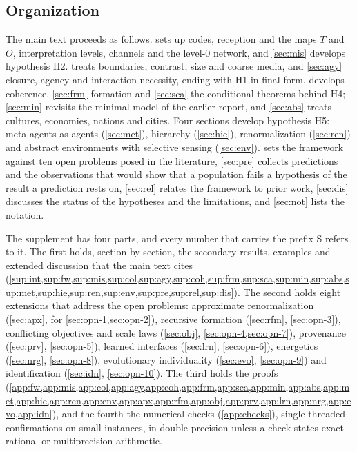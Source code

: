 \subsection{Organization}\label{sec:int-organization}

The main text proceeds as follows.  sets up codes, reception and the maps $T$ and $O$, interpretation levels, channels and the level-0 network, and \cref{sec:mis} develops hypothesis H2.  treats boundaries, contrast, size and coarse media, and \cref{sec:agy} closure, agency and interaction necessity, ending with H1 in final form.  develops coherence, \cref{sec:frm} formation and \cref{sec:sca} the conditional theorems behind H4; \cref{sec:min} revisits the minimal model of the earlier report, and \cref{sec:abs} treats cultures, economies, nations and cities. Four sections develop hypothesis H5: meta-agents as agents (\cref{sec:met}), hierarchy (\cref{sec:hie}), renormalization (\cref{sec:ren}) and abstract environments with selective sensing (\cref{sec:env}).  sets the framework against ten open problems posed in the literature, \cref{sec:pre} collects predictions and the observations that would show that a population fails a hypothesis of the result a prediction rests on, \cref{sec:rel} relates the framework to prior work, \cref{sec:dis} discusses the status of the hypotheses and the limitations, and \cref{sec:not} lists the notation.

The supplement has four parts, and every number that carries the prefix S refers to it. The first holds, section by section, the secondary results, examples and extended discussion that the main text cites (\cref{sup:int,sup:fw,sup:mis,sup:col,sup:agy,sup:coh,sup:frm,sup:sca,sup:min,sup:abs,sup:met,sup:hie,sup:ren,sup:env,sup:pre,sup:rel,sup:dis}). The second holds eight extensions that address the open problems: approximate renormalization (\cref{sec:apx}, for \cref{sec:opn-1,sec:opn-2}), recursive formation (\cref{sec:rfm}, \cref{sec:opn-3}), conflicting objectives and scale laws (\cref{sec:obj}, \cref{sec:opn-4,sec:opn-7}), provenance (\cref{sec:prv}, \cref{sec:opn-5}), learned interfaces (\cref{sec:lrn}, \cref{sec:opn-6}), energetics (\cref{sec:nrg}, \cref{sec:opn-8}), evolutionary individuality (\cref{sec:evo}, \cref{sec:opn-9}) and identification (\cref{sec:idn}, \cref{sec:opn-10}). The third holds the proofs (\cref{app:fw,app:mis,app:col,app:agy,app:coh,app:frm,app:sca,app:min,app:abs,app:met,app:hie,app:ren,app:env,app:apx,app:rfm,app:obj,app:prv,app:lrn,app:nrg,app:evo,app:idn}), and the fourth the numerical checks (\cref{app:checks}), single-threaded confirmations on small instances, in double precision unless a check states exact rational or multiprecision arithmetic.
